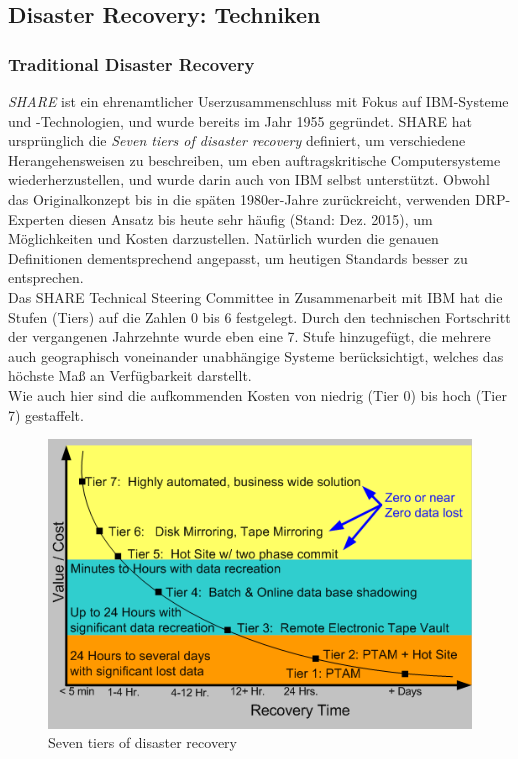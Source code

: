 \documentclass[letterpaper, 12pt]{article}
\let\tempsubsection\subsection
\renewcommand\subsection[1]{\vspace{0cm}\tempsubsection{#1}\vspace{0cm}}
\let\tempsubsubsection\subsubsection
\renewcommand\subsubsection[1]{\vspace{0cm}\tempsubsubsection{#1}\vspace{0cm}}
\begin{document}
\subsection{Disaster Recovery: Techniken \cite{traddr} \cite{traddr2}}

\subsubsection{Traditional Disaster Recovery}

\textit{SHARE} ist ein ehrenamtlicher Userzusammenschluss mit Fokus auf IBM-Systeme und -Technologien, und wurde bereits im Jahr 1955 gegründet. SHARE hat ursprünglich die \textit{Seven tiers of disaster recovery} definiert, um verschiedene Herangehensweisen zu beschreiben, um eben auftragskritische Computersysteme wiederherzustellen, und wurde darin auch von IBM selbst unterstützt. Obwohl das Originalkonzept bis in die späten 1980er-Jahre zurückreicht, verwenden DRP-Experten diesen Ansatz bis heute sehr häufig (Stand: Dez. 2015), um Möglichkeiten und Kosten darzustellen. Natürlich wurden die genauen Definitionen dementsprechend angepasst, um heutigen Standards besser zu entsprechen. \\
Das SHARE Technical Steering Committee in Zusammenarbeit mit IBM hat die Stufen (Tiers) auf die Zahlen 0 bis 6 festgelegt. Durch den technischen Fortschritt der vergangenen Jahrzehnte wurde eben eine 7. Stufe hinzugefügt, die mehrere auch geographisch voneinander unabhängige Systeme berücksichtigt, welches das höchste Maß an Verfügbarkeit darstellt. \\
Wie auch hier sind die aufkommenden Kosten von niedrig (Tier 0) bis hoch (Tier 7) gestaffelt.

\begin{figure}[h]
	\begin{center}
		\includegraphics[width=0.6\linewidth]{images/7-tier}
		\caption{Seven tiers of disaster recovery \cite{bild1}}
		\label{Seven tiers of disaster recovery}
	\end{center}
\end{figure}
\end{document}
